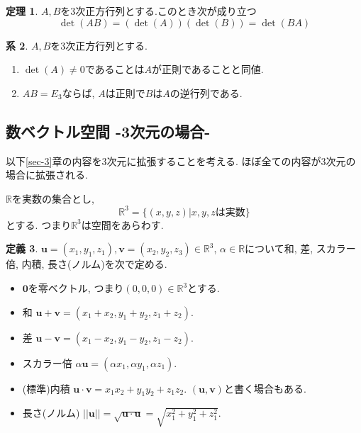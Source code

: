 \documentclass[dvipdfmx,a4paper,11pt]{article}
\newcommand{\R}{\mathbb{R}}
\theoremstyle{definition}
\newtheorem{thm}{定理}
\newtheorem{cor}[thm]{系}
\newtheorem{dfn}[thm]{定義}
\begin{document}
\begin{tcolorbox}[
    colback = white,
    colframe = green!35!black,
    fonttitle = \bfseries,
    breakable = true]
    \begin{thm}
   \label{determinant}
$A,B$を3次正方行列とする.このとき次が成り立つ
$$\det(AB)=(\det(A))(\det(B)) = \det(BA)$$
  \end{thm}
 \end{tcolorbox}
 


\begin{tcolorbox}[
    colback = white,
    colframe = green!35!black,
    fonttitle = \bfseries,
    breakable = true]
    \begin{cor}
   \label{determinant}
$A,B$を3次正方行列とする.
\begin{enumerate}
	\setlength{\parskip}{0cm}
  	\setlength{\itemsep}{0pt} 
\item $\det(A) \neq 0$であることは$A$が正則であることと同値.
\item $AB=E_3$ならば, $A$は正則で$B$は$A$の逆行列である. 
\end{enumerate}
  \end{cor}
 \end{tcolorbox}


\subsection{数ベクトル空間 -3次元の場合-}
以下\ref{sec-3}章の内容を3次元に拡張することを考える. 
ほぼ全ての内容が3次元の場合に拡張される. 

$\R$を実数の集合とし, 
$$
\R^3  = \{ (x, y,z) | \text{$x,y,z$は実数}\} 
$$
とする. 
つまり$\R^3$は空間をあらわす.


\begin{tcolorbox}[
    colback = white,
    colframe = green!35!black,
    fonttitle = \bfseries,
    breakable = true]
    \begin{dfn}
$\bm{u}=(x_1, y_1, z_1), \bm{v}=(x_2, y_2, z_3)\in \R^3$, $\alpha \in \R$について和, 差, スカラー倍, 内積, 長さ(ノルム)を次で定める.
\begin{itemize}
	\setlength{\parskip}{0cm}
  	\setlength{\itemsep}{0pt} 
\item $\bm{0}$を零ベクトル, つまり$(0,0,0) \in \R^3$とする.
\item 和 $\bm{u} + \bm{v} = (x_1 + x_2, y_1+ y_2, z_1 + z_2)$.
\item 差 $\bm{u} - \bm{v} = (x_1 - x_2, y_1 - y_2, z_1 - z_2)$.
\item スカラー倍 $\alpha \bm{u} = (\alpha x_1, \alpha y_1, \alpha z_1)$.
\item (標準)内積 $\bm{u} \cdot\bm{v} = x_1 x_2 +  y_1 y_2+ z_1z_2 $. $(\bm{u}, \bm{v})$と書く場合もある. 
\item 長さ(ノルム) $||\bm{u}||= \sqrt{\bm{u} \cdot\bm{u}} = \sqrt{x_{1}^2 +  y_{1}^{2} +  z_{1}^{2} }$.
\end{itemize}
    \end{dfn}
 \end{tcolorbox}
\end{document}
